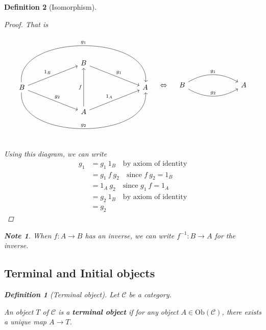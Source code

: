 \documentclass{article}
\newtheorem{definition}{Definition}[section]
\newtheorem{note}{Note}[section]
\begin{document}
\begin{definition}[Isomorphism]
\begin{proof}
            That is
            \[
                \begin{tikzcd}[column sep=7em, row sep=2em]
                    & B \arrow[dr, "g_1"]  \\
                    B \arrow[ur,  "1_B"] \arrow[dr, "g_2"] \arrow[rr, bend left = 95, "g_1"] \arrow[rr, bend right=95, "g_2"] & & A\\
                    & A \arrow[ur, "1_A"] \arrow[uu, "f"]
                \end{tikzcd} \quad
                \Leftrightarrow \quad
                \begin{tikzcd}[column sep=7em, row sep=2em]
                    B\arrow[bend left, "g_1"]{r}\arrow[bend right, "g_2"]{r}&A
                \end{tikzcd}
            \]

            Using this diagram, we can write
            \[
                \begin{align}
                    g_1 &= g_1 \ 1_B \quad \text{by axiom of identity} \\
                    &= g_1 \ f \  g_2  \quad \text{since } f \ g_2 = 1_B \\
                    &= 1_A \ g_2 \quad \text{since } g_1 \ f = 1_A \\
                    &= g_2 \ 1_B \quad \text{by axiom of identity} \\
                    &= g_2
                \end{align}
            \]
        \end{proof}

        \begin{note}
            When $f: A \to B$ has an inverse, we can write $f^{-1}: B \to A$ for the inverse.
        \end{note}

        \subsection{Terminal and Initial objects}

        \begin{definition}[Terminal object]
            Let $\mathcal{C}$ be a category.

            An object $T$ of $\mathcal{C}$ is a \textbf{terminal object} if for any object $A \in \text{Ob}(\mathcal{C})$, there exists a unique map $A \to T$.
        \end{definition}


\end{definition}
\end{document}
